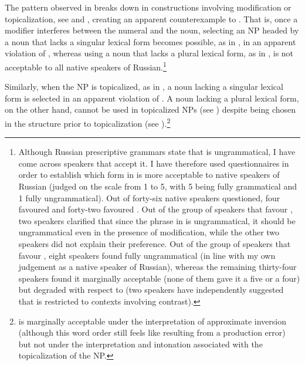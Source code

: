 \documentclass[output=paper,
modfonts,
newtxmath,
hidelinks
]{langscibook}
\begin{document}
The pattern observed in  breaks down in constructions involving modification or topicalization, see  and , creating an apparent counterexample to . That is, once a modifier interferes between the numeral and the noun, selecting an NP headed by a noun that lacks a singular lexical form becomes possible, as in , in an apparent violation of , whereas using a noun that lacks a plural lexical form, as in , is not acceptable to all native speakers of Russian.\footnote{\label{fn7}Although Russian prescriptive grammars state that  is ungrammatical, I have come across speakers that accept it. I have therefore used questionnaires in order to establish which form in  is more acceptable to native speakers of Russian (judged on the scale from 1 to 5, with 5 being fully grammatical and 1 fully ungrammatical). Out of forty-six native speakers questioned, four favoured  and forty-two favoured . Out of the group of speakers that favour , two speakers clarified that since the phrase in  is ungrammatical, it should be ungrammatical even in the presence of modification, while the other two speakers did not explain their preference. Out of the group of speakers that favour , eight speakers found  fully ungrammatical (in line with my own judgement as a native speaker of Russian), whereas the remaining thirty-four speakers found it marginally acceptable (none of them gave it a five or a four) but degraded with respect to  (two speakers have independently suggested that  is restricted to contexts involving contrast).} 
\ea \label{ex9}
	\z
\z

\noindent Similarly, when the NP is topicalized, as in , a noun lacking a singular lexical form is selected in an apparent violation of . A noun lacking a plural lexical form, on the other hand, cannot be used in topicalized NPs (see ) despite being chosen in the structure prior to topicalization (see ).\footnote{\label{fn8} is marginally acceptable under the interpretation of approximate inversion (although this word order still feels like resulting from a production error) but not under the interpretation and intonation associated with the topicalization of the NP.}
\end{document}
